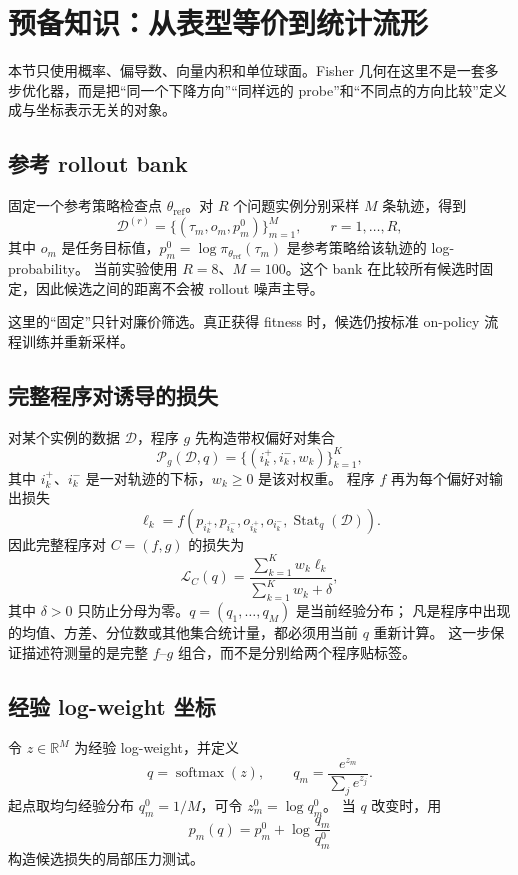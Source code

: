 \documentclass[UTF8,11pt]{ctexart}
\newcommand{\R}{\mathbb{R}}
\newcommand{\softmax}{\operatorname{softmax}}
\begin{document}
\section{预备知识：从表型等价到统计流形}

本节只使用概率、偏导数、向量内积和单位球面。Fisher 几何在这里不是一套多步优化器，而是把“同一个下降方向”“同样远的 probe”和“不同点的方向比较”定义成与坐标表示无关的对象。

\subsection{参考 rollout bank}

固定一个参考策略检查点 $\theta_{\mathrm{ref}}$。对 $R$ 个问题实例分别采样 $M$ 条轨迹，得到
\[
\mathcal D^{(r)}=\{(\tau_m,o_m,p_m^0)\}_{m=1}^{M},\qquad r=1,\ldots,R,
\]
其中 $o_m$ 是任务目标值，$p_m^0=\log\pi_{\theta_{\mathrm{ref}}}(\tau_m)$ 是参考策略给该轨迹的 log-probability。
当前实验使用 $R=8$、$M=100$。这个 bank 在比较所有候选时固定，因此候选之间的距离不会被 rollout 噪声主导。

这里的“固定”只针对廉价筛选。真正获得 fitness 时，候选仍按标准 on-policy 流程训练并重新采样。

\subsection{完整程序对诱导的损失}

对某个实例的数据 $\mathcal D$，程序 $g$ 先构造带权偏好对集合
\[
\mathcal P_g(\mathcal D,q)=\{(i_k^+,i_k^-,w_k)\}_{k=1}^{K},
\]
其中 $i_k^+$、$i_k^-$ 是一对轨迹的下标，$w_k\ge 0$ 是该对权重。
程序 $f$ 再为每个偏好对输出损失
\[
\ell_k=f\!\left(p_{i_k^+},p_{i_k^-},o_{i_k^+},o_{i_k^-},\operatorname{Stat}_q(\mathcal D)\right).
\]
因此完整程序对 $C=(f,g)$ 的损失为
\begin{equation}
\mathcal L_C(q)=
\frac{\sum_{k=1}^{K}w_k\ell_k}{\sum_{k=1}^{K}w_k+\delta},
\label{eq:loss}
\end{equation}
其中 $\delta>0$ 只防止分母为零。$q=(q_1,\ldots,q_M)$ 是当前经验分布；
凡是程序中出现的均值、方差、分位数或其他集合统计量，都必须用当前 $q$ 重新计算。
这一步保证描述符测量的是完整 $f$--$g$ 组合，而不是分别给两个程序贴标签。

\subsection{经验 log-weight 坐标}

令 $z\in\R^M$ 为经验 log-weight，并定义
\[
q=\softmax(z),\qquad q_m=\frac{e^{z_m}}{\sum_j e^{z_j}}.
\]
起点取均匀经验分布 $q_m^0=1/M$，可令 $z_m^0=\log q_m^0$。
当 $q$ 改变时，用
\begin{equation}
p_m(q)=p_m^0+\log\frac{q_m}{q_m^0}
\label{eq:effective-p}
\end{equation}
构造候选损失的局部压力测试。
\end{document}
